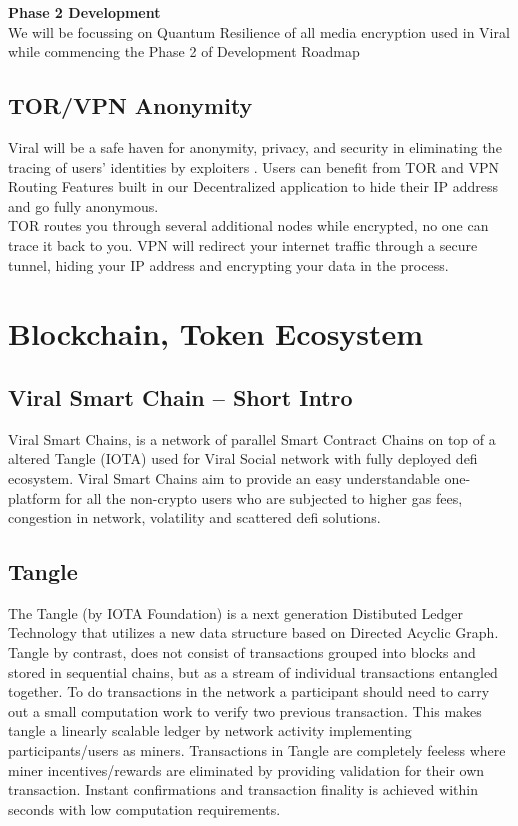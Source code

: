 \documentclass[conference]{IEEEtran}
\begin{document}
\textbf{Phase 2 Development}\\

We will be focussing on Quantum Resilience of all media encryption used in Viral while commencing the Phase 2 of Development Roadmap\\

\subsection{\textbf{TOR/VPN Anonymity}}

Viral will be a safe haven for anonymity, privacy, and security in eliminating the tracing of users' identities by exploiters . Users can benefit from TOR and VPN Routing Features built in our Decentralized application to hide their IP address and go fully anonymous.\\

TOR routes you through several additional nodes while encrypted, no one can trace it back to you. VPN will redirect your internet traffic through a secure tunnel, hiding your IP address and encrypting your data in the process.\\

\section{\textbf{Blockchain, Token Ecosystem}}

\subsection{\textbf{Viral Smart Chain – Short Intro}}

Viral Smart Chains, is a network of parallel Smart Contract Chains on top of a altered Tangle (IOTA) used for Viral Social network with fully deployed defi ecosystem. Viral Smart Chains aim to provide an easy understandable one-platform for all the non-crypto users who are subjected to higher gas fees, congestion in network, volatility and scattered defi solutions. \\

\subsection{\textbf{Tangle}}

The Tangle (by IOTA Foundation) is a next generation Distibuted Ledger Technology that utilizes a new data structure based on Directed Acyclic Graph. Tangle by contrast, does not consist of transactions grouped into blocks and stored in sequential chains, but as a stream of individual transactions entangled together. To do transactions in the network a participant should need to carry out a small computation work to verify two previous transaction. This makes tangle a linearly scalable ledger by network activity implementing participants/users as miners. Transactions in Tangle are completely feeless where miner incentives/rewards are eliminated by providing validation for their own transaction. Instant confirmations and transaction finality is achieved within seconds with low computation requirements.
\end{document}

